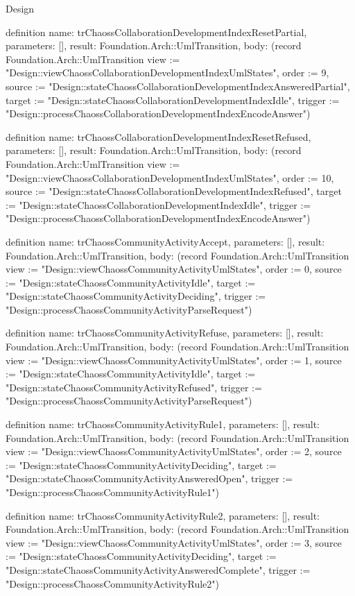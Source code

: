 \begin{lexlean}{Design}
\begin{semanticmodule}
definition{
  name: trChaossCollaborationDevelopmentIndexResetPartial,
  parameters: [],
  result: Foundation.Arch::UmlTransition,
  body: (record Foundation.Arch::UmlTransition {view := "Design::viewChaossCollaborationDevelopmentIndexUmlStates", order := 9, source := "Design::stateChaossCollaborationDevelopmentIndexAnsweredPartial", target := "Design::stateChaossCollaborationDevelopmentIndexIdle", trigger := "Design::processChaossCollaborationDevelopmentIndexEncodeAnswer"})
}

definition{
  name: trChaossCollaborationDevelopmentIndexResetRefused,
  parameters: [],
  result: Foundation.Arch::UmlTransition,
  body: (record Foundation.Arch::UmlTransition {view := "Design::viewChaossCollaborationDevelopmentIndexUmlStates", order := 10, source := "Design::stateChaossCollaborationDevelopmentIndexRefused", target := "Design::stateChaossCollaborationDevelopmentIndexIdle", trigger := "Design::processChaossCollaborationDevelopmentIndexEncodeAnswer"})
}

definition{
  name: trChaossCommunityActivityAccept,
  parameters: [],
  result: Foundation.Arch::UmlTransition,
  body: (record Foundation.Arch::UmlTransition {view := "Design::viewChaossCommunityActivityUmlStates", order := 0, source := "Design::stateChaossCommunityActivityIdle", target := "Design::stateChaossCommunityActivityDeciding", trigger := "Design::processChaossCommunityActivityParseRequest"})
}

definition{
  name: trChaossCommunityActivityRefuse,
  parameters: [],
  result: Foundation.Arch::UmlTransition,
  body: (record Foundation.Arch::UmlTransition {view := "Design::viewChaossCommunityActivityUmlStates", order := 1, source := "Design::stateChaossCommunityActivityIdle", target := "Design::stateChaossCommunityActivityRefused", trigger := "Design::processChaossCommunityActivityParseRequest"})
}

definition{
  name: trChaossCommunityActivityRule1,
  parameters: [],
  result: Foundation.Arch::UmlTransition,
  body: (record Foundation.Arch::UmlTransition {view := "Design::viewChaossCommunityActivityUmlStates", order := 2, source := "Design::stateChaossCommunityActivityDeciding", target := "Design::stateChaossCommunityActivityAnsweredOpen", trigger := "Design::processChaossCommunityActivityRule1"})
}

definition{
  name: trChaossCommunityActivityRule2,
  parameters: [],
  result: Foundation.Arch::UmlTransition,
  body: (record Foundation.Arch::UmlTransition {view := "Design::viewChaossCommunityActivityUmlStates", order := 3, source := "Design::stateChaossCommunityActivityDeciding", target := "Design::stateChaossCommunityActivityAnsweredComplete", trigger := "Design::processChaossCommunityActivityRule2"})
}


\end{semanticmodule}
\end{lexlean}
